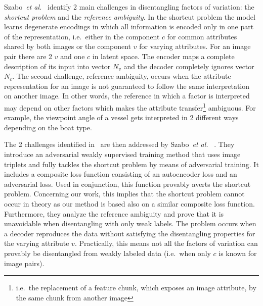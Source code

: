 \documentclass[a4paper,12pt]{report}
\begin{document}
Szabo~\textit{et al.}~\cite{ChallengInDisentIFoF} identify 2 main challenges in disentangling factors of variation: the \textit{shortcut problem} and the \textit{reference ambiguity}. In the shortcut problem the model learns degenerate encodings in which all information is encoded only in one part of the representation, i.e.\ either in the component $c$ for common attributes shared by both images or the component $v$ for varying attributes. For an image pair there are 2 $v$ and one $c$ in latent space. The encoder maps a complete description of its input into vector $N_v$ and the decoder completely ignores vector $N_c$.
The second challenge, reference ambiguity, occurs when the attribute representation for an image is not guaranteed to follow the same interpretation on another image. In other words, the reference in which a factor is interpreted may depend on other factors which makes the attribute transfer\footnote{i.e.\ the replacement of a feature chunk, which exposes an image attribute, by the same chunk from another image} ambiguous. For example, the viewpoint angle of a vessel gets interpreted in 2 different ways depending on the boat type.
\par The 2 challenges identified in~\cite{ChallengInDisentIFoF} are then addressed by Szabo~\textit{et al.}~ \cite{UnderstDegenAndAmbInAT}. They introduce an adversarial weakly supervised training method that uses image triplets and fully tackles the shortcut problem by means of adversarial training. It includes a composite loss function consisting of an autoencoder loss and an adversarial loss. Used in conjunction, this function provably averts the shortcut problem. Concerning our work, this implies that the shortcut problem cannot occur in theory as our method is based also on a similar composite loss function. Furthermore, they analyze the reference ambiguity and prove that it is unavoidable when disentangling with only weak labels. The problem occurs when a decoder reproduces the data without satisfying the disentangling properties for the varying attribute $v$. Practically, this means not all the factors of variation can provably be disentangled from weakly labeled data (i.e.\ when only $c$ is known for image pairs).    
\end{document}
